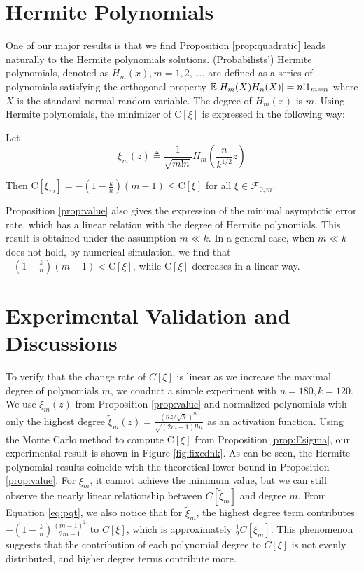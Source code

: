 \documentclass[appliedmath,article,accept,pdftex,moreauthors]{Definitions/mdpi}
\begin{document}
\section{Hermite {P}olynomials}\label{sec:hp}

One of our major results is that we find Proposition \ref{prop:quadratic} leads naturally to the Hermite polynomials solutions.
(Probabilists') Hermite polynomials, denoted as $H_m(x),m=1,2,\dots$,
are defined as a series of polynomials satisfying the orthogonal property \linebreak$ \mathbb{E}[H_m(X)H_n(X)] = n! \mathrm{1}_{m=n}$ where $X$ is the standard normal random variable.
The degree of $H_m(x)$ is $m$.
Using Hermite polynomials, the minimizer of $\mathrm{C}[\xi]$ is expressed in the following way:
\begin{Proposition}\label{prop:value}
Let
\begin{equation}\label{eq:ximopt}
    \xi_m(z) \triangleq \frac{1}{\sqrt{m!n}} H_m\left(\frac{n}{k^{1/2}} z\right)
\end{equation}

{Then} $\mathrm{C}[\xi_m] = -(1-\frac{k}{n})(m-1) \leq \mathrm{C}[\xi] $ for all $\xi \in \mathcal{F}_{0,m}$.
\end{Proposition}
Proposition \ref{prop:value} also gives the expression of the minimal asymptotic error rate, which has a linear relation with the degree of Hermite polynomials. This result is obtained
under the assumption $ m \ll k$. In a general case, when $ m \ll k$ does not hold, by numerical simulation, we find that $-(1-\frac{k}{n})(m-1) < \mathrm{C}[\xi]$, while $\mathrm{C}[\xi]$ decreases in a linear way.

\section{Experimental Validation and Discussions}\label{sec:er}

To verify that the change rate of $C[\xi]$ is linear as we increase the maximal degree of polynomials $m$,
we conduct a simple experiment with $n=180, k=120$. We use $\xi_m(z)$ from Proposition
\ref{prop:value} and normalized polynomials with only the highest degree $\tilde{\xi}_m(z) = \frac{(nz/\sqrt{k})^m}{\sqrt{(2m-1)!!n}}$ as an activation function. Using the Monte Carlo method to compute $\mathrm{C}[\xi]$ from Proposition \ref{prop:Esigma},
our experimental result is shown in Figure \ref{fig:fixednk}.
As can be seen, the Hermite polynomial results coincide with the theoretical lower bound in Proposition \ref{prop:value}.
For $\tilde{\xi}_m$, it cannot achieve the minimum value,
but we can still observe the nearly linear relationship between $C[\tilde{\xi}_m]$ and degree $m$.
From Equation \eqref{eq:pqt}, we also notice that for $\tilde{\xi}_m$,
the highest degree term contributes $-(1-\frac{k}{n})\frac{(m-1)^2}{2m-1}$ to $C[\xi]$,
which is approximately $\frac{1}{2} C[\xi_m]$.
This phenomenon suggests that the contribution of each polynomial
degree to $C[\xi]$ is not evenly distributed, and
higher degree terms contribute more.  
\end{document}
